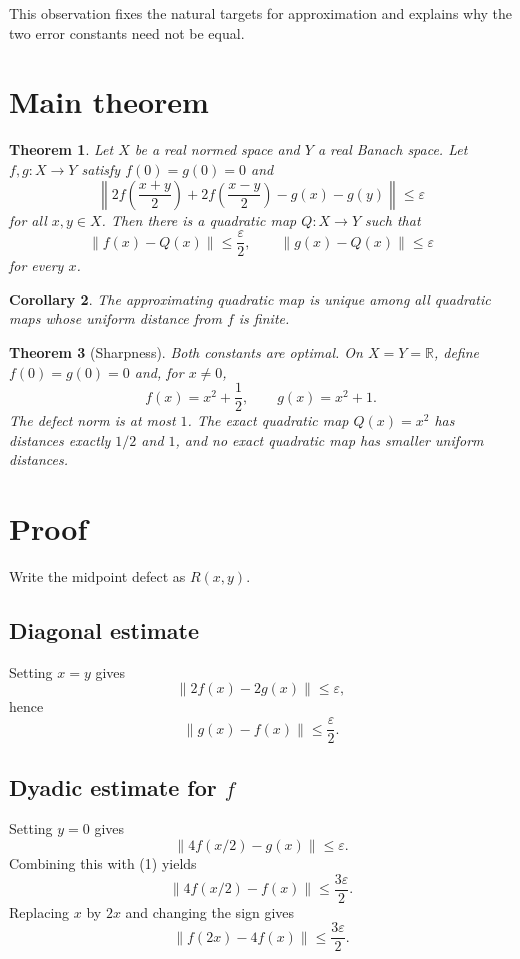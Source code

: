 \documentclass[11pt]{article}
\newtheorem{theorem}{Theorem}[section]
\newtheorem{corollary}[theorem]{Corollary}
\theoremstyle{definition}
\theoremstyle{remark}
\begin{document}
This observation fixes the natural targets for approximation and explains why the two error constants need not be equal.

\section{Main theorem}

\begin{theorem}\label{thm:main}
Let $X$ be a real normed space and $Y$ a real Banach space. Let $f,g:X\to Y$ satisfy $f(0)=g(0)=0$ and
\[
\left\|2f\!\left(\frac{x+y}{2}\right)+2f\!\left(\frac{x-y}{2}\right)-g(x)-g(y)\right\|\le\varepsilon
\]
for all $x,y\in X$. Then there is a quadratic map $Q:X\to Y$ such that
\[
\|f(x)-Q(x)\|\le\frac{\varepsilon}{2},\qquad
\|g(x)-Q(x)\|\le\varepsilon
\]
for every $x$.
\end{theorem}

\begin{corollary}
The approximating quadratic map is unique among all quadratic maps whose uniform distance from $f$ is finite.
\end{corollary}

\begin{theorem}[Sharpness]
Both constants are optimal. On $X=Y=\mathbb R$, define $f(0)=g(0)=0$ and, for $x\ne0$,
\[
f(x)=x^2+\frac12,\qquad g(x)=x^2+1.
\]
The defect norm is at most $1$. The exact quadratic map $Q(x)=x^2$ has distances exactly $1/2$ and $1$, and no exact quadratic map has smaller uniform distances.
\end{theorem}

\section{Proof}

Write the midpoint defect as $R(x,y)$.

\subsection{Diagonal estimate}
Setting $x=y$ gives
\[
\|2f(x)-2g(x)\|\le\varepsilon,
\]
hence
\[
\|g(x)-f(x)\|\le\frac{\varepsilon}{2}. \tag{1}
\]

\subsection{Dyadic estimate for $f$}
Setting $y=0$ gives
\[
\|4f(x/2)-g(x)\|\le\varepsilon.
\]
Combining this with (1) yields
\[
\|4f(x/2)-f(x)\|\le\frac{3\varepsilon}{2}.
\]
Replacing $x$ by $2x$ and changing the sign gives
\[
\|f(2x)-4f(x)\|\le\frac{3\varepsilon}{2}. \tag{2}
\]
\end{document}
